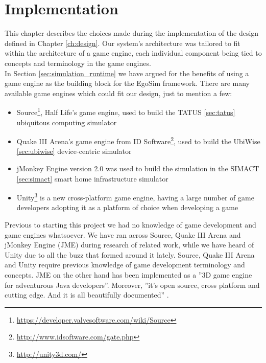 \chapter{Implementation}\label{ch:implementation}
This chapter describes the choices made during the implementation of the design defined in Chapter \ref{ch:design}. Our system's architecture was tailored to fit within the architecture of a game engine, each individual component being tied to concepts and terminology in the game engines.\\ 

In Section \ref{sec:simulation_runtime} we have argued for the benefits of using a game engine as the building block for the EgoSim framework. There are many available game engines which could fit our design, just to mention a few:
\begin{itemize}
	\item Source\footnote{\url{https://developer.valvesoftware.com/wiki/Source}}, Half Life's game engine, used to build the TATUS \ref{sec:tatus} ubiquitous computing simulator
	\item Quake III Arena's game engine from ID Software\footnote{\url{http://www.idsoftware.com/gate.php}}, used to build the UbiWise \ref{sec:ubiwise} device-centric simulator
	\item jMonkey Engine version 2.0 \cite{jme:online} was used to build the simulation in the SIMACT \ref{sec:simact} smart home infrastructure simulator
	\item Unity\footnote{\url{http://unity3d.com/}} is a new cross-platform game engine, having a large number of game developers adopting it as a platform of choice when developing a game
\end{itemize}

Previous to starting this project we had no knowledge of game development and game engines whatsoever. We have ran across Source, Quake III Arena and jMonkey Engine (JME) during research of related work, while we have heard of Unity due to all the buzz that formed around it lately. Source, Quake III Arena and Unity require previous knowledge of game development terminology and concepts. JME on the other hand has been implemented as a ''3D game engine for adventurous Java developers''. Moreover, ''it's open source, cross platform and cutting edge. And it is all beautifully documented'' \cite{jme:online}.\\


